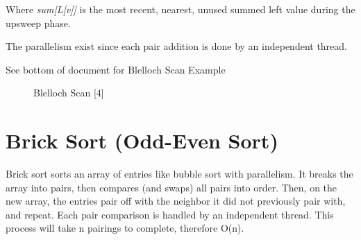 \documentclass[twoside]{article}
\begin{document}
Where \emph{sum[L[v]]} is the most recent, nearest, unused summed left value during the upsweep phase.


The parallelism exist since each pair addition is done by an independent thread. 

See bottom of document for Blelloch Scan Example 

\begin{figure}[!h]
  \centering
  \caption{Blelloch Scan [4]}
  \label{fig:Bleloch}
\end{figure}

\section{Brick Sort (Odd-Even Sort)}
Brick sort sorts an array of entries like bubble sort with parallelism. It breaks the array into pairs, then compares (and swaps) all pairs into order. Then, on the new array, the entries pair off with the neighbor it did not previously pair with, and repeat. Each pair comparison is handled by an independent thread. This process will take n pairings to complete, therefore O(n).
\end{document}
